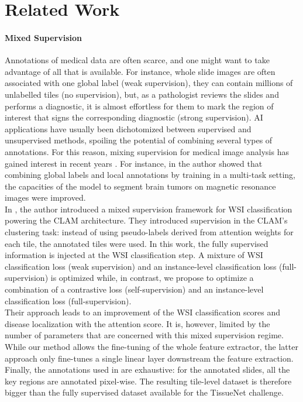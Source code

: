 \section{Related Work}

\paragraph{Mixed Supervision}

Annotations of medical data are often scarce, and one might want to take advantage of all that is available. For instance, whole slide images are often associated with one global label (weak supervision), they can contain millions of unlabelled tiles (no supervision), but, as a pathologist reviews the slides and performs a diagnostic, it is almost effortless for them to mark the region of interest that signs the corresponding diagnostic (strong supervision). AI applications have usually been dichotomized between supervised and unsupervised methods, spoiling the potential of combining several types of annotations. For this reason, mixing supervision for medical image analysis  has gained interest in recent years \citep{huang_rectifying_2020, li_thoracic_2018, li_hybrid_2021}.
For instance, in \citep{mlynarski_deep_2019} the author showed that combining global labels and local annotations by training in a multi-task setting, the capacities of the model to segment brain tumors on magnetic resonance images were improved.  \\
In \citep{tourniaire_attention-based_2021}, the author introduced a mixed supervision framework for WSI classification powering the CLAM \citep{lu_data-efficient_2021} architecture. They introduced supervision in the CLAM’s clustering task: instead of using pseudo-labels derived from attention weights for each tile, the annotated tiles were used.  In this work, the fully supervised information is injected at the WSI classification step. A mixture of WSI classification loss (weak supervision) and an instance-level classification loss (full-supervision) is optimized while, in contrast, we propose to optimize a combination of a contrastive loss (self-supervision) and an instance-level classification loss (full-supervision). \\
Their approach leads to an improvement of the WSI classification scores and disease localization with the attention score. It is, however, limited by the number of parameters that are concerned with this mixed supervision regime. While our method allows the fine-tuning of the whole feature extractor, the latter approach only fine-tunes a single linear layer downstream the feature extraction. Finally, the annotations used in \citep{tourniaire_attention-based_2021} are exhaustive: for the annotated slides, all the key regions are annotated pixel-wise. The resulting tile-level dataset is therefore bigger than the fully supervised dataset available for the TissueNet challenge.
